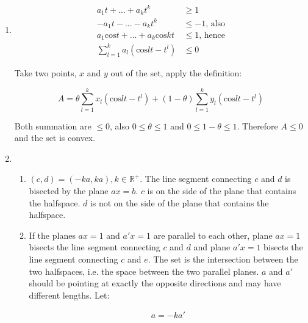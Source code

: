 \documentclass[11pt, letterpaper, titlepage]{article}
\begin{document}
\begin{enumerate}
    \item %
    
    \begin{equation*}
        \begin{aligned}
            a_{1}t + ... + a_{k}t^{k} &\geq 1 \\
            -a_{1}t - ... - a_{k}t^{k} &\leq -1 \text{, also} \\
            a_{1}\text{cos} t + ... + a_{k} \text{cos} kt &\leq 1 \text{, hence} \\
            \sum_{l=1}^{k} a_{l}(\text{cos} lt - t^{l}) &\leq 0
        \end{aligned}
    \end{equation*}
    
    Take two points, $ x $ and $ y $ out of the set, apply the definition:
    
    \begin{equation*}
        A = \theta \sum_{l=1}^{k} x_{l}(\text{cos} lt - t^{l}) + (1-\theta) \sum_{l=1}^{k} y_{l}(\text{cos} lt - t^{l})
    \end{equation*}
    
    Both summation are $ \leq 0 $, also $ 0 \leq \theta \leq 1 $ and $ 0 \leq 1 - \theta \leq 1 $. Therefore $ A \leq 0 $ and the set is convex.
    
    \item %
    
    \begin{enumerate}
        \item $ (c, d) = (-ka, ka), k\in \mathbb{R}^{+}$. The line segment connecting $ c $ and $ d $ is bisected by the plane $ a x = b $. $ c $ is on the side of the plane that contains the halfspace. $ d $ is not on the side of the plane that contains the halfspace.
        
        \item If the planes $ a x = 1 $ and $ a' x = 1 $ are parallel to each other, plane $ a x = 1 $ bisects the line segment connecting $ c $ and $ d $ and plane $ a' x = 1 $ bisects the line segment connecting $ c $ and $ e $. The set is the intersection between the two halfspaces, i.e. the space between the two parallel planes. $ a $ and $ a' $ should be pointing at exactly the opposite directions and may have different lengths. Let:
        
        \begin{equation*}
            \begin{aligned}
                a = - k a'
            \end{aligned}
        \end{equation*}
        

\end{enumerate}
\end{enumerate}
\end{document}
